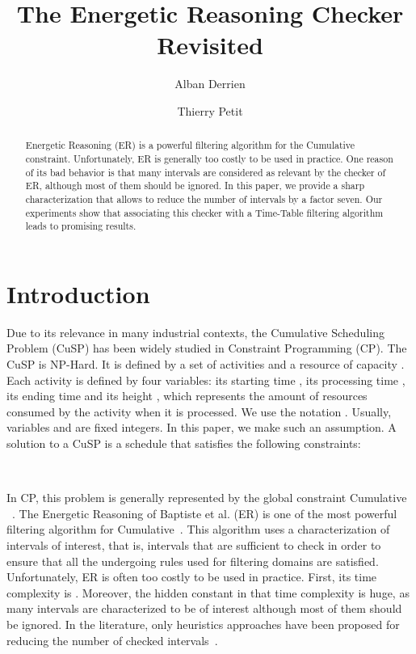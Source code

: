 \documentclass{llncs}
\begin{document}


\title{The Energetic Reasoning Checker Revisited}

\author{Alban Derrien \and Thierry Petit
}

\maketitle
\sloppy 

\begin{abstract} 
Energetic Reasoning  (ER) is a powerful filtering algorithm for the Cumulative constraint. Unfortunately, ER is generally too costly to be used in practice. 
One reason of its bad behavior is that many intervals are considered as relevant by the checker of ER, although most of them should be ignored. In this paper, we provide a sharp characterization that 
allows to reduce the number of intervals by a factor seven. Our experiments show that associating this checker with a Time-Table 
filtering algorithm leads to promising results. 
\end{abstract}

\section{Introduction}
Due to its relevance in many industrial contexts, the Cumulative Scheduling Problem (CuSP) has been widely studied in Constraint Programming (CP). 
The CuSP is NP-Hard. It is defined by a set of activities  and a resource of capacity . 
Each activity  is defined by four variables: its starting time , its processing time , its ending time  and its height , which represents the amount of resources consumed by the activity 
when it is processed. We use the notation . 
Usually, variables  and  are fixed integers. In this paper, we make such an assumption. A solution to a CuSP is a schedule that satisfies the following constraints: 
\begin{center}
~~~~~~~~~~~~
 \end{center}


In CP, this problem is generally represented by the global constraint \textsf{Cumulative} ~\cite{aggbel93}.
The Energetic Reasoning of Baptiste et al. (ER) is one of the most powerful filtering algorithm for Cumulative~\cite{baptiste:inria-00123562}. 
This algorithm uses a characterization of intervals of interest, that is, intervals that are sufficient to check in order to ensure that all the undergoing rules used 
for filtering domains are satisfied. Unfortunately, ER is often too costly to be used in practice. First, its time complexity is . Moreover, 
the hidden constant in that time complexity is huge, as many intervals are characterized to be of interest although most of them should be ignored. 
In the literature, only heuristics approaches have been proposed for reducing the number of checked intervals~\cite{Berthold:2011:ApproxCrit}. 
\end{document}
